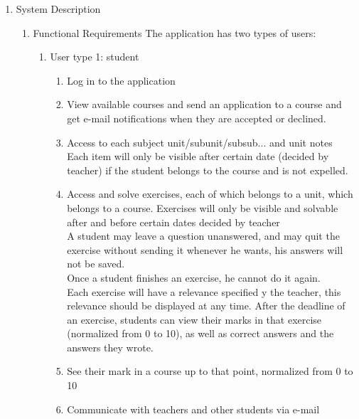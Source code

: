 \documentclass{article}
\begin{document}
\begin{enumerate}
	\item{System Description}
	\begin{enumerate}
		\item{Functional Requirements}
		The application has two types of users:
		\begin{enumerate}
			\item User type 1: student
			\begin{enumerate}
				\item Log in to the application\\
				\item View available courses and send an application to a course and get e-mail notifications when they are accepted or declined.\\
				\item Access to each subject unit/subunit/subsub... and unit notes\\
				Each item will only be visible after certain date (decided by teacher) if the student belongs to the course and is not expelled.\\
				\item Access and solve exercises, each of which belongs to a unit, which belongs to a course. Exercises will only be visible and solvable after and before certain dates decided by teacher \\
				A student may leave a question unanswered, and may quit the exercise without sending it whenever he wants, his answers will not be saved.\\
				Once a student finishes an exercise, he cannot do it again. \\
				Each exercise will have a relevance specified y the teacher, this relevance should be displayed at any time.
				After the deadline of an exercise, students can view their marks in that exercise (normalized from 0 to 10), as well as correct answers and the answers they wrote.\\
				\item See their mark in a course up to that point, normalized from 0 to 10
				\item Communicate with teachers and other students via e-mail		\\
				

\end{enumerate}
\end{enumerate}
\end{enumerate}
\end{enumerate}
\end{document}
